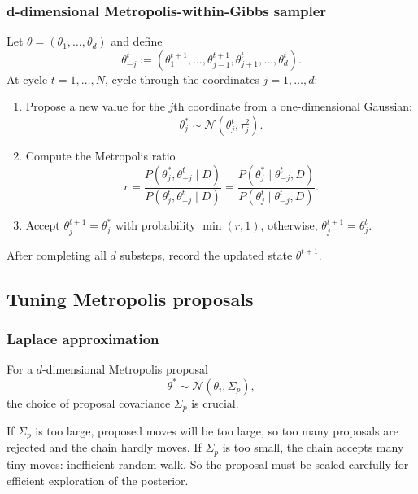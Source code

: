 \documentclass[11pt, titlepage]{article} %
\numberwithin{equation}{section}
\theoremstyle{definition}
\numberwithin{assumption}{section}
\begin{document}
\subsubsection*{d-dimensional Metropolis-within-Gibbs sampler}

Let $\theta=(\theta_1,\dots,\theta_d)$ and define
\begin{equation*}
    \theta_{-j}^t
    :=
    (\theta_1^{t+1},\dots,\theta_{j-1}^{t+1},\theta_{j+1}^t,\dots,\theta_d^t).
\end{equation*}
At cycle $t=1,\dots,N$, cycle through the coordinates $j=1,\dots,d$:

\begin{enumerate}
    \item Propose a new value for the $j$th coordinate from a one-dimensional Gaussian:
    \begin{equation*}
        \theta_j^* \sim \mathcal{N}(\theta_j^t,\tau_j^2).
    \end{equation*}
    \item Compute the Metropolis ratio
    \begin{equation*}
        r
        =
        \frac{P(\theta_j^*,\theta_{-j}^t\mid D)}
             {P(\theta_j^t,\theta_{-j}^t\mid D)}
        =
        \frac{P(\theta_j^*\mid \theta_{-j}^t,D)}
             {P(\theta_j^t\mid \theta_{-j}^t,D)}.
    \end{equation*}
    \item Accept $\theta_j^{t+1}=\theta_j^*$ with probability $\min(r,1)$, otherwise, $\theta_j^{t+1}=\theta_j^t$.
\end{enumerate}
After completing all $d$ substeps, record the updated state $\theta^{t+1}$.

\subsection{Tuning Metropolis proposals}



\subsubsection*{Laplace approximation}
For a \(d\)-dimensional Metropolis proposal
\begin{equation*}
    \theta^*\sim \mathcal{N}(\theta_i,\Sigma_p),
\end{equation*}
the choice of proposal covariance $\Sigma_p$ is crucial.

If $\Sigma_p$ is too large, proposed moves will be too large, so too many proposals are rejected and the chain hardly moves. If $\Sigma_p$ is too small, the chain accepts many tiny moves: inefficient random walk. So the proposal must be scaled carefully for efficient exploration of the posterior.
\end{document}
